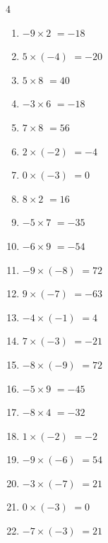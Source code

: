 \begin{multicols}{4}
\begin{enumerate}
  \item $-9\times 2$
        $=-18$

  \item $5\times (-4)$
        $=-20$

  \item $5\times 8$
        $=40$

  \item $-3\times 6$
        $=-18$

  \item $7\times 8$
        $=56$

  \item $2\times (-2)$
        $=-4$

  \item $0\times (-3)$
        $=0$

  \item $8\times 2$
        $=16$

  \item $-5\times 7$
        $=-35$

  \item $-6\times 9$
        $=-54$

  \item $-9\times (-8)$
        $=72$

  \item $9\times (-7)$
        $=-63$

  \item $-4\times (-1)$
        $=4$

\columnbreak %

\resetques

  \item $7\times (-3)$
        $=-21$

  \item $-8\times (-9)$
        $=72$

  \item $-5\times 9$
        $=-45$

  \item $-8\times 4$
        $=-32$

  \item $1\times (-2)$
        $=-2$

  \item $-9\times (-6)$
        $=54$

  \item $-3\times (-7)$
        $=21$

  \item $0\times (-3)$
        $=0$

  \item $-7\times (-3)$
        $=21$


\end{enumerate}
\end{multicols}
